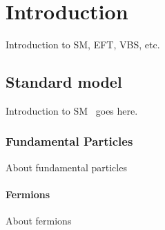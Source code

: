 \chapter{
  Introduction
 }\label{introchap}

Introduction to \gls{SM}, \gls{EFT}, \gls{VBS}, etc.

\section{Standard model}

Introduction to \gls{SM}~\cite{Yang-Mill:1954} goes here.

\subsection{Fundamental Particles}

About fundamental particles

\subsubsection{Fermions}

About fermions

